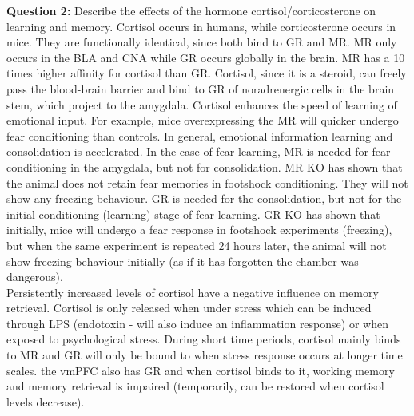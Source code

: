 \documentclass[twosided, a4paper, pt11]{article}
\begin{document}
	
	\textbf{Question 2:} Describe the effects of the hormone cortisol/corticosterone on learning and memory.\newline
	Cortisol occurs in humans, while corticosterone occurs in mice. They are functionally identical, since both bind to GR and MR. MR only occurs in the BLA and CNA while GR occurs globally in the brain. MR has a 10 times higher affinity for cortisol than GR. Cortisol, since it is a steroid, can freely pass the blood-brain barrier and bind to GR of noradrenergic cells in the brain stem, which project to the amygdala. Cortisol enhances the speed of learning of emotional input. For example, mice overexpressing the MR will quicker undergo fear conditioning than controls. In general, emotional information learning and consolidation is accelerated. In the case of fear learning, MR is needed for fear conditioning in the amygdala, but not for consolidation. MR KO has shown that the animal does not retain fear memories in footshock conditioning. They will not show any freezing behaviour. GR is needed for the consolidation, but not for the initial conditioning (learning) stage of fear learning. GR KO has shown that initially, mice will undergo a fear response in footshock experiments (freezing), but when the same experiment is repeated 24 hours later, the animal will not show freezing behaviour initially (as if it has forgotten the chamber was dangerous).\\
	Persistently increased levels of cortisol have a negative influence on memory retrieval. Cortisol is only released when under stress which can be induced through LPS (endotoxin - will also induce an inflammation response) or when exposed to psychological stress. During short time periods, cortisol mainly binds to MR and GR will only be bound to when stress response occurs at longer time scales. the vmPFC also has GR and when cortisol binds to it, working memory and memory retrieval is impaired (temporarily, can be restored when cortisol levels decrease).\newline 
	
\end{document}
